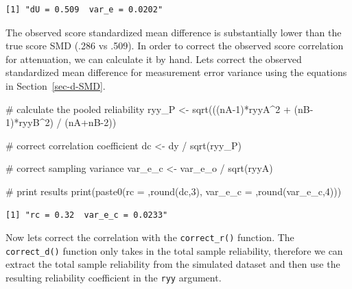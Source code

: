 \documentclass[
  letterpaper,
  DIV=11,
  numbers=noendperiod]{scrreprt}
\newenvironment{Shaded}{\begin{snugshade}}{\end{snugshade}}
\newcommand{\CommentTok}[1]{\textcolor[rgb]{0.37,0.37,0.37}{#1}}
\newcommand{\DecValTok}[1]{\textcolor[rgb]{0.68,0.00,0.00}{#1}}
\newcommand{\FunctionTok}[1]{\textcolor[rgb]{0.28,0.35,0.67}{#1}}
\newcommand{\NormalTok}[1]{\textcolor[rgb]{0.00,0.23,0.31}{#1}}
\newcommand{\OtherTok}[1]{\textcolor[rgb]{0.00,0.23,0.31}{#1}}
\newcommand{\SpecialCharTok}[1]{\textcolor[rgb]{0.37,0.37,0.37}{#1}}
\newcommand{\StringTok}[1]{\textcolor[rgb]{0.13,0.47,0.30}{#1}}
\begin{document}
\begin{verbatim}
[1] "dU = 0.509  var_e = 0.0202"
\end{verbatim}

The observed score standardized mean difference is substantially lower
than the true score SMD (.286 vs .509). In order to correct the observed
score correlation for attenuation, we can calculate it by hand. Lets
correct the observed standardized mean difference for measurement error
variance using the equations in Section~\ref{sec-d-SMD}.

\begin{Shaded}
\begin{Highlighting}[]
\CommentTok{\# calculate the pooled reliability}
\NormalTok{ryy\_P }\OtherTok{\textless{}{-}} \FunctionTok{sqrt}\NormalTok{(((nA}\DecValTok{{-}1}\NormalTok{)}\SpecialCharTok{*}\NormalTok{ryyA}\SpecialCharTok{\^{}}\DecValTok{2} \SpecialCharTok{+}\NormalTok{ (nB}\DecValTok{{-}1}\NormalTok{)}\SpecialCharTok{*}\NormalTok{ryyB}\SpecialCharTok{\^{}}\DecValTok{2}\NormalTok{) }\SpecialCharTok{/}\NormalTok{ (nA}\SpecialCharTok{+}\NormalTok{nB}\DecValTok{{-}2}\NormalTok{))}

\CommentTok{\# correct correlation coefficient}
\NormalTok{dc }\OtherTok{\textless{}{-}}\NormalTok{ dy }\SpecialCharTok{/} \FunctionTok{sqrt}\NormalTok{(ryy\_P)}

\CommentTok{\# correct sampling variance}
\NormalTok{var\_e\_c }\OtherTok{\textless{}{-}}\NormalTok{ var\_e\_o }\SpecialCharTok{/} \FunctionTok{sqrt}\NormalTok{(ryyA)}

\CommentTok{\# print results}
\FunctionTok{print}\NormalTok{(}\FunctionTok{paste0}\NormalTok{(}\StringTok{\textquotesingle{}rc = \textquotesingle{}}\NormalTok{,}\FunctionTok{round}\NormalTok{(dc,}\DecValTok{3}\NormalTok{),}\StringTok{\textquotesingle{}  var\_e\_c = \textquotesingle{}}\NormalTok{,}\FunctionTok{round}\NormalTok{(var\_e\_c,}\DecValTok{4}\NormalTok{)))}
\end{Highlighting}
\end{Shaded}

\begin{verbatim}
[1] "rc = 0.32  var_e_c = 0.0233"
\end{verbatim}

Now lets correct the correlation with the \texttt{correct\_r()}
function. The \texttt{correct\_d()} function only takes in the total
sample reliability, therefore we can extract the total sample
reliability from the simulated dataset and then use the resulting
reliability coefficient in the \texttt{ryy} argument.
\end{document}
